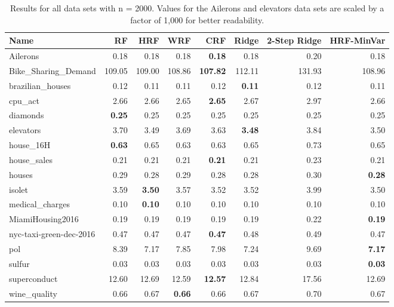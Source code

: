\begin{table}[ht]
\centering
\begingroup\scriptsize
\begin{tabular}{lrrrrrrr}
  \hline
\textbf{ Name } & \textbf{ RF } & \textbf{ HRF } & \textbf{ WRF } & \textbf{ CRF } & \textbf{ Ridge } & \textbf{ 2-Step Ridge } & \textbf{ HRF-MinVar } \\ 
  \hline
Ailerons & 0.18 & 0.18 & 0.18 & \textbf{0.18} & 0.18 & 0.20 & 0.18 \\ 
  Bike\_Sharing\_Demand & 109.05 & 109.00 & 108.86 & \textbf{107.82} & 112.11 & 131.93 & 108.96 \\ 
  brazilian\_houses & 0.12 & 0.11 & 0.11 & 0.12 & \textbf{0.11} & 0.12 & 0.11 \\ 
  cpu\_act & 2.66 & 2.66 & 2.65 & \textbf{2.65} & 2.67 & 2.97 & 2.66 \\ 
  diamonds & \textbf{0.25} & 0.25 & 0.25 & 0.25 & 0.25 & 0.25 & 0.25 \\ 
  elevators & 3.70 & 3.49 & 3.69 & 3.63 & \textbf{3.48} & 3.84 & 3.50 \\ 
  house\_16H & \textbf{0.63} & 0.65 & 0.63 & 0.63 & 0.65 & 0.73 & 0.65 \\ 
  house\_sales & 0.21 & 0.21 & 0.21 & \textbf{0.21} & 0.21 & 0.23 & 0.21 \\ 
  houses & 0.29 & 0.28 & 0.29 & 0.28 & 0.28 & 0.30 & \textbf{0.28} \\ 
  isolet & 3.59 & \textbf{3.50} & 3.57 & 3.52 & 3.52 & 3.99 & 3.50 \\ 
  medical\_charges & 0.10 & \textbf{0.10} & 0.10 & 0.10 & 0.10 & 0.10 & 0.10 \\ 
  MiamiHousing2016 & 0.19 & 0.19 & 0.19 & 0.19 & 0.19 & 0.22 & \textbf{0.19} \\ 
  nyc-taxi-green-dec-2016 & 0.47 & 0.47 & 0.47 & \textbf{0.47} & 0.48 & 0.49 & 0.47 \\ 
  pol & 8.39 & 7.17 & 7.85 & 7.98 & 7.24 & 9.69 & \textbf{7.17} \\ 
  sulfur & 0.03 & 0.03 & 0.03 & 0.03 & 0.03 & 0.03 & \textbf{0.03} \\ 
  superconduct & 12.60 & 12.69 & 12.59 & \textbf{12.57} & 12.84 & 17.56 & 12.69 \\ 
  wine\_quality & 0.66 & 0.67 & \textbf{0.66} & 0.66 & 0.67 & 0.70 & 0.67 \\ 
   \hline
\end{tabular}
\endgroup
\caption{Results for all data sets with n = 2000. Values for the Ailerons and elevators data sets are scaled by a factor of 1,000 for better readability.} 
\end{table}
